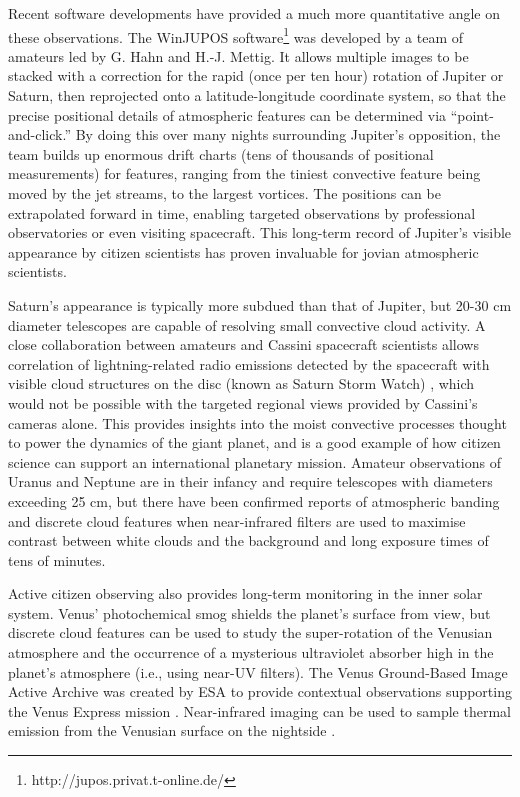 \documentclass{ar2e}
\begin{document}
Recent software developments have provided a much more quantitative angle on
these observations. The WinJUPOS
software\footnote{http://jupos.privat.t-online.de/} was developed by a team of
amateurs led by G. Hahn and H.-J. Mettig. It allows multiple images to be
stacked with a correction for the rapid (once per ten hour) rotation of Jupiter
or Saturn, then reprojected onto a latitude-longitude coordinate system, so that
the precise positional details of atmospheric features can be determined via
``point-and-click.''  By doing this over many nights surrounding Jupiter's
opposition, the team builds up enormous drift charts (tens of thousands of
positional measurements) for features, ranging from the tiniest convective
feature being moved by the jet streams, to the largest vortices.  The positions
can be extrapolated forward in time, enabling targeted observations by
professional observatories or even visiting spacecraft.  This long-term record
of Jupiter's visible appearance by citizen scientists has proven invaluable for
jovian atmospheric scientists.


Saturn's appearance is typically more subdued than that of Jupiter, but 20-30 cm
diameter telescopes are capable of resolving small convective cloud activity.  A
close collaboration between amateurs and Cassini spacecraft scientists allows
correlation of lightning-related radio emissions detected by the spacecraft with
visible cloud structures on the disc (known as Saturn Storm Watch)
\citep[e.g.,][]{11fischer}, which would not be possible with the targeted
regional views provided by Cassini's cameras alone.  This provides insights into
the moist convective processes thought to power the dynamics of the giant
planet, and is a good example of how citizen science can support an
international planetary mission. Amateur observations of Uranus and Neptune are
in their infancy and require telescopes with diameters exceeding 25 cm, but
there have been confirmed reports of atmospheric banding and discrete cloud
features when near-infrared filters are used to maximise contrast between white
clouds and the background and long exposure times of tens of minutes.

Active citizen observing also provides long-term monitoring in the inner solar
system.  Venus' photochemical smog shields the planet's surface from view, but
discrete cloud features can be used to study the super-rotation of the Venusian
atmosphere and the occurrence of a mysterious ultraviolet absorber high in the
planet's atmosphere (i.e., using near-UV filters).  The Venus Ground-Based Image
Active Archive was created by ESA to provide contextual observations supporting
the Venus Express mission \citep{08barentsen}.  Near-infrared imaging can be
used to sample thermal emission from the Venusian surface on the nightside
\citep{93lecacheax}. 
\end{document}
